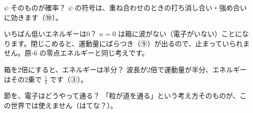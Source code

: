 \begin{tsumazuki}{$\psi$ そのものが確率？}
$\psi$ の符号は、重ね合わせのときの打ち消し合い・強め合いに効きます（⑩）。
\end{tsumazuki}

\begin{tsumazuki}{いちばん低いエネルギーは0？}
$n=0$ は箱に波がない（電子がいない）ことになります。閉じこめると、運動量にばらつき（⑨）が出るので、止まっていられません。原-6 の零点エネルギーと同じ考えです。
\end{tsumazuki}

\begin{tsumazuki}{箱を2倍にすると、エネルギーは半分？}
波長が2倍で運動量が半分、エネルギーはその2乗で $\tfrac14$ です（③）。
\end{tsumazuki}

\begin{tsumazuki}{節を、電子はどうやって通る？}
「粒が道を通る」という考え方そのものが、この世界では使えません（はてな？）。
\end{tsumazuki}


